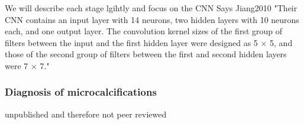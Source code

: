 
We will describe each stage lgihtly and focus on the CNN 
Says Jiang2010 "Their CNN contains an input layer with 14 neurons, two hidden layers with 10 neurons each, and one output layer. The convolution kernel sizes of the first group of filters between the input and the first hidden layer were designed as 5 × 5, and those of the second group of filters between the first and second hidden layers were 7 × 7."




\subsubsection{Diagnosis of microcalcifications}
unpublished and therefore not peer reviewed






